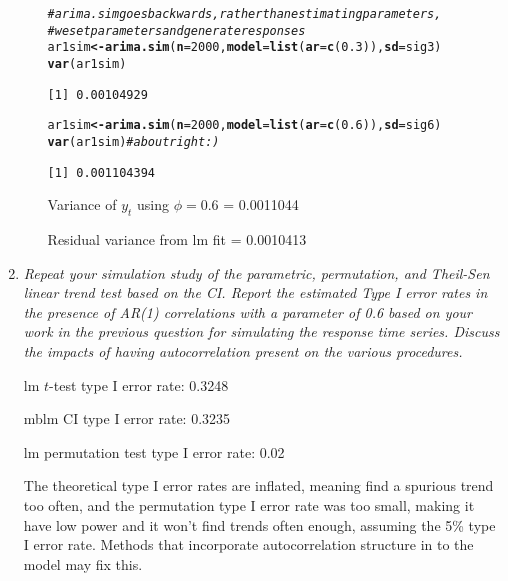 \documentclass[11pt]{article}\usepackage[]{graphicx}\usepackage[]{color}
\makeatletter
\newcommand{\hlnum}[1]{\textcolor[rgb]{0,0,0}{#1}}%
\newcommand{\hlcom}[1]{\textcolor[rgb]{0.4,0.4,0.4}{\textit{#1}}}%
\newcommand{\hlstd}[1]{\textcolor[rgb]{0,0,0}{#1}}%
\newcommand{\hlkwb}[1]{\textcolor[rgb]{0,0,0}{\textbf{#1}}}%
\newcommand{\hlkwc}[1]{\textcolor[rgb]{0,0,0}{\textbf{#1}}}%
\newcommand{\hlkwd}[1]{\textcolor[rgb]{0,0,0}{\textbf{#1}}}%
\newenvironment{kframe}{%
 \def\at@end@of@kframe{}%
 \ifinner\ifhmode%
  \def\at@end@of@kframe{\end{minipage}}%
  \begin{minipage}{\columnwidth}%
 \fi\fi%
 \def\FrameCommand##1{\hskip\@totalleftmargin \hskip-\fboxsep
 \colorbox{shadecolor}{##1}\hskip-\fboxsep
     \hskip-\linewidth \hskip-\@totalleftmargin \hskip\columnwidth}%
 \MakeFramed {\advance\hsize-\width
   \@totalleftmargin\z@ \linewidth\hsize
   \@setminipage}}%
 {\par\unskip\endMakeFramed%
 \at@end@of@kframe}
\newenvironment{knitrout}{}{} %
\makeatother
\begin{document}
\begin{enumerate}
\begin{enumerate}
\begin{knitrout}
\begin{kframe}
\begin{alltt}
\hlcom{#arima.sim goes backwards, rather than estimating parameters, }
\hlcom{#we set parameters and generate responses}
\hlstd{ar1sim}\hlkwb{<-}\hlkwd{arima.sim}\hlstd{(}\hlkwc{n}\hlstd{=}\hlnum{2000}\hlstd{,}\hlkwc{model}\hlstd{=}\hlkwd{list}\hlstd{(}\hlkwc{ar}\hlstd{=}\hlkwd{c}\hlstd{(}\hlnum{0.3}\hlstd{)),}\hlkwc{sd}\hlstd{=sig3)}
\hlkwd{var}\hlstd{(ar1sim)}
\end{alltt}
\begin{verbatim}
[1] 0.00104929
\end{verbatim}
\begin{alltt}
\hlstd{ar1sim}\hlkwb{<-}\hlkwd{arima.sim}\hlstd{(}\hlkwc{n}\hlstd{=}\hlnum{2000}\hlstd{,}\hlkwc{model}\hlstd{=}\hlkwd{list}\hlstd{(}\hlkwc{ar}\hlstd{=}\hlkwd{c}\hlstd{(}\hlnum{0.6}\hlstd{)),}\hlkwc{sd}\hlstd{=sig6)}
\hlkwd{var}\hlstd{(ar1sim)} \hlcom{# about right :)}
\end{alltt}
\begin{verbatim}
[1] 0.001104394
\end{verbatim}
\end{kframe}
\end{knitrout}

Variance of $y_t$ using $\phi=0.6$ = 0.0011044

Residual variance from lm fit = 0.0010413

\end{enumerate}

\item%
{\it Repeat your simulation study of the parametric, permutation, and Theil-Sen linear trend test based on the CI. Report the estimated Type I error rates in the presence of AR(1) correlations with a parameter of 0.6 based on your work in the previous question for simulating the response time series. Discuss the impacts of having autocorrelation present on the various procedures.}



lm $t$-test type I error rate: 0.3248

mblm CI type I error rate: 0.3235

lm permutation test type I error rate: 0.02

The theoretical type I error rates are inflated, meaning find a spurious trend too often, and the permutation type I error rate was too small, making it have low power and it won't find trends often enough, assuming the 5\% type I error rate. Methods that incorporate autocorrelation structure in to the model may fix this.


\end{enumerate}
\end{document}
